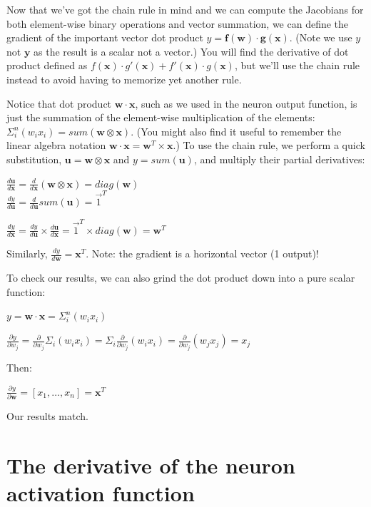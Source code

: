 \documentclass[11pt]{article}
\begin{document}
Now that we've got the chain rule in mind and we can compute the Jacobians for both element-wise binary operations and vector summation, we can define the gradient of the important vector dot product $y = \mathbf{f(w)} \cdot \mathbf{g(x)}$. (Note we use $y$ not $\mathbf{y}$ as the result is a scalar not a vector.) You will find the derivative of dot product defined as $f(\mathbf{x}) \cdot g'(\mathbf{x}) + f'(\mathbf{x}) \cdot g(\mathbf{x})$, but we'll use the chain rule instead to avoid having to memorize yet another rule.

Notice that dot product $\mathbf{w} \cdot \mathbf{x}$, such as we used in the neuron output function, is just the summation of the element-wise multiplication of the elements: $\Sigma_i^n (w_i x_i) = sum(\mathbf{w} \otimes \mathbf{x})$. (You might also find it useful to remember the linear algebra notation $\mathbf{w} \cdot \mathbf{x} = \mathbf{w}^{T} \times \mathbf{x}$.)  To use the chain rule, we perform a quick substitution, $\mathbf{u} = \mathbf{w} \otimes \mathbf{x}$ and $y = sum(\mathbf{u})$, and multiply their partial derivatives:

$\frac{d \mathbf{u}}{d\mathbf{x}} = \frac{d}{d\mathbf{x}} (\mathbf{w} \otimes \mathbf{x}) = diag(\mathbf{w})$\\
$\frac{dy}{d\mathbf{u}} = \frac{d}{d\mathbf{u}} sum(\mathbf{u}) = \vec{1}^T$

$\frac{dy}{d\mathbf{x}} = \frac{dy}{d\mathbf{u}} \times \frac{d\mathbf{u}}{d\mathbf{x}} = \vec{1}^T \times diag(\mathbf{w}) = \mathbf{w}^T$

Similarly, $\frac{dy}{d\mathbf{w}} = \mathbf{x}^T$. Note: the gradient is a horizontal vector (1 output)!

To check our results, we can also grind the dot product down into a pure scalar function:

$y = \mathbf{w} \cdot \mathbf{x} = \Sigma_i^n (w_i x_i)$

$\frac{\partial y}{\partial w_j} = \frac{\partial}{\partial w_j} \Sigma_i (w_i x_i) = \Sigma_i \frac{\partial}{\partial w_j} (w_i x_i) = \frac{\partial}{\partial w_j} (w_j x_j) = x_j$

Then:

$\frac{\partial y}{\partial \mathbf{w}} = [ x_1, \ldots, x_n ] = \mathbf{x}^T$

Our results match. 

\section{The derivative of the neuron activation function}
\end{document}
